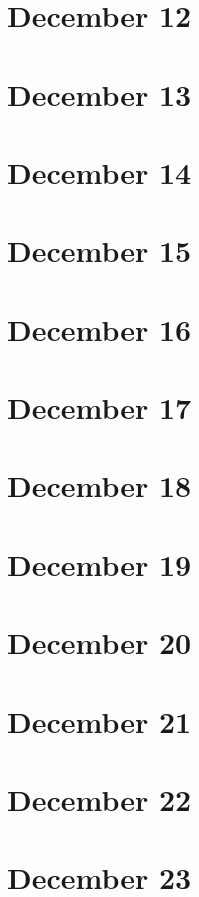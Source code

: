 \section{December 12}

\section{December 13}

\section{December 14}

\section{December 15}

\section{December 16}

\section{December 17}

\section{December 18}

\section{December 19}

\section{December 20}

\section{December 21}

\section{December 22}

\section{December 23}

